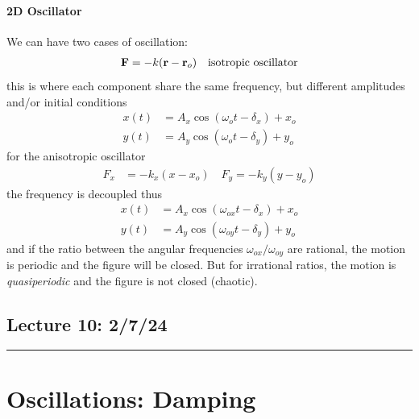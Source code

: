 \documentclass[../main.tex]{subfiles}
\begin{document}
\paragraph*{2D Oscillator} We can have two cases of oscillation:
\begin{align*}
    \vb{F} = -k (\vb{r} - \vb{r}_o) \quad \textrm{isotropic oscillator}
\end{align*}
this is where each component share the same frequency, but different amplitudes and/or initial
conditions
\begin{align*}
    x(t) &= A_x \cos(\omega_o t - \delta_x) + x_o \\
    y(t) &= A_y \cos(\omega_o t - \delta_y) + y_o
\end{align*}
for the anisotropic oscillator
\begin{align*}
    F_x &= -k_x (x - x_o) \quad F_y = -k_y (y - y_o)
\end{align*}
the frequency is decoupled thus
\begin{align*}
    x(t) &= A_x \cos(\omega_{ox} t - \delta_x) + x_o \\
    y(t) &= A_y \cos(\omega_{oy} t - \delta_y) + y_o
\end{align*}
and if the ratio between the angular frequencies $\omega_{ox} / \omega_{oy}$ are rational, the
motion is periodic and the figure will be closed. But for irrational ratios, the motion is
\emph{quasiperiodic} and the figure is not closed (chaotic).

\newpage
\subsection*{Lecture 10: \hfill  2/7/24}
\hrule \vspace{10px}

\section*{Oscillations: Damping}
\end{document}
